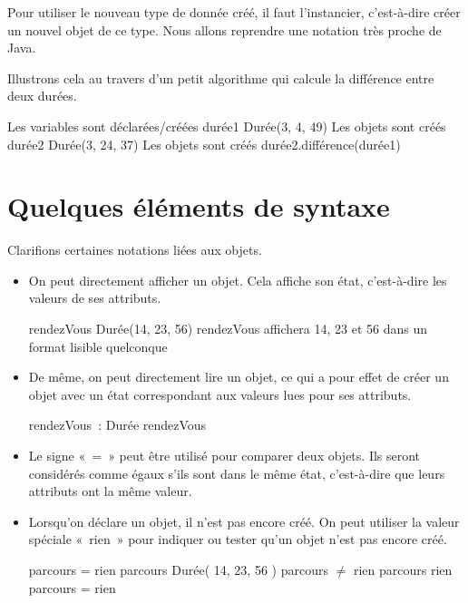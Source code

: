 	Pour utiliser le nouveau type de donnée créé,
	il faut l'instancier, c'est-à-dire créer un nouvel objet de ce type.
	Nous allons reprendre une notation très proche de Java.
	
	Illustrons cela au travers d'un petit algorithme
	qui calcule la différence entre deux durées.
	
	\begin{LDA}
				\RComment Les variables sont déclarées/créées
			\Let durée1 \Gets {} Durée(3, 4, 49)	\RComment Les objets sont créés
			\Let durée2 \Gets {} Durée(3, 24, 37)	\RComment Les objets sont créés
			\Write durée2.différence(durée1)
		\EndAlgo
	\end{LDA}
	
\section{Quelques éléments de syntaxe}

	Clarifions certaines notations liées aux objets.

	\begin{itemize}
		\item
			On peut directement afficher un objet. 
			Cela affiche son état, c'est-à-dire les valeurs de ses attributs.

			\begin{LDA}
				\Decl{rendezVous}{Durée}
				\Let rendezVous \Gets {} Durée(14, 23, 56)
				\Write rendezVous 
				\RComment affichera 14, 23 et 56 dans un format lisible quelconque
			\end{LDA}
		\item
			De même, on peut directement lire un objet,
			ce qui a pour effet de créer un objet avec un état
			correspondant aux valeurs lues pour ses attributs.

			\begin{LDA}
				\Decl rendezVous~: Durée
				\Read rendezVous
			\end{LDA}
		\item 
			Le signe «~=~» peut être utilisé pour comparer deux objets.
			Ils seront considérés comme égaux s'ils sont dans le même état, 
			c'est-à-dire que leurs attributs ont la même valeur.
		\item
			Lorsqu'on déclare un objet, il n'est pas encore créé.
			On peut utiliser la valeur spéciale «~rien~»
			pour indiquer ou tester qu'un objet n'est pas encore créé.
			
			\begin{LDA}
												\RComment parcours = rien
				\Let parcours \Gets {} Durée( 14, 23, 56 )	\RComment parcours ${\neq}$ rien
				\If{parcours $\neq$ rien}
					\Let parcours \Gets rien						\RComment parcours = rien
				\EndIf
			\end{LDA}
	\end{itemize}
			

